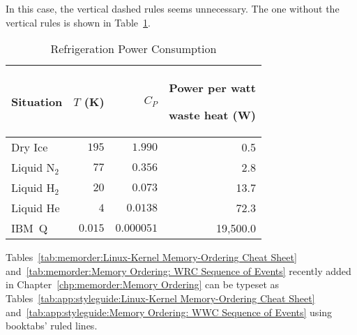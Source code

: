 In this case, the vertical dashed rules seems unnecessary.
The one without the vertical rules is shown in
Table~\ref{tab:app:styleguide:Refrigeration Power Consumption (arydshln-2)}.

\begin{table}[H]
\renewcommand*{\arraystretch}{1.2}\centering\small
\begin{tabular}{lrrr}\toprule
Situation
	& $T$ (K)
		& $C_P$	& \parbox[b]{.75in}{\raggedleft Power per watt\par waste heat (W)} \\
\midrule
Dry Ice
	& $195$
		& $1.990$
			& 0.5 \\ \hdashline
Liquid N$_2$
	& $77$
		& $0.356$
			& 2.8 \\ \hdashline
Liquid H$_2$
	& $20$
		& $0.073$
			& 13.7 \\ \hdashline
Liquid He
	& $4$
		& $0.0138$
			& 72.3 \\ \hdashline
IBM~Q	& $0.015$
		& $0.000051$
			& 19,500.0 \\
\bottomrule
\end{tabular}
\caption{Refrigeration Power Consumption}
\label{tab:app:styleguide:Refrigeration Power Consumption (arydshln-2)}
\end{table}

Tables~\ref{tab:memorder:Linux-Kernel Memory-Ordering Cheat Sheet}
and~\ref{tab:memorder:Memory Ordering: WRC Sequence of Events}
recently added in Chapter~\ref{chp:memorder:Memory Ordering}
can be typeset as
Tables~\ref{tab:app:styleguide:Linux-Kernel Memory-Ordering Cheat Sheet}
and~\ref{tab:app:styleguide:Memory Ordering: WWC Sequence of Events}
using booktabs' ruled lines.

